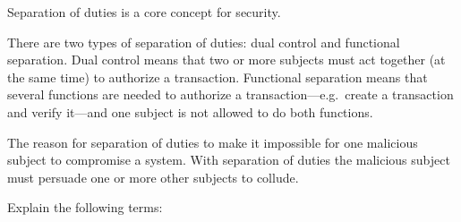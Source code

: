 \documentclass[svv,addpoints]{miunexam}
\begin{document}
\begin{questions}
\question\label{q:accountability:E:C}
  Separation of duties is a core concept for security.

  \begin{solution}
    There are two types of separation of duties:
    dual control and functional separation.
    Dual control means that two or more subjects must act together (at the same 
    time) to authorize a transaction.
    Functional separation means that several functions are needed to authorize 
    a transaction---e.g.~create a transaction and verify it---and one subject 
    is not allowed to do both functions.

    The reason for separation of duties to make it impossible for one malicious 
    subject to compromise a system.
    With separation of duties the malicious subject must persuade one or more 
    other subjects to collude.
  \end{solution}


  
\question\label{q:passwd:auth:E}
  Explain the following terms:
\end{questions}
\end{document}
